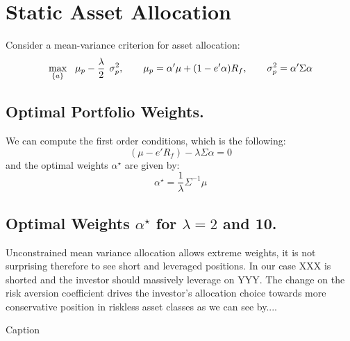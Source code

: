 \chapter{Static Asset Allocation}
Consider a mean-variance criterion for asset allocation:
\begin{equation}
    \underset{\{ a\}}{\textrm{max}} \hspace{0.3cm} \mu_p - \frac{\lambda}{2} \hspace{0.15cm} \sigma_p ^2 , \hspace{0.7cm} \mu_p = \alpha'\mu + (1 - e' \alpha)R_f, \hspace{0.7cm} \sigma_p ^2 = \alpha' \Sigma \alpha
\end{equation}

\section{Optimal Portfolio Weights.}
We can compute the first order conditions, which is the following:
$$
(\mu-e'R_f) - \lambda \Sigma \alpha = 0
$$
and the optimal weights $\alpha^\star$ are given by:
$$
\alpha^\star = \frac{1}{\lambda} \Sigma^{-1} \mu
$$


\section{Optimal Weights $\alpha^\star$ for $\lambda = 2$ and 10.}


Unconstrained mean variance allocation allows extreme weights, it is not surprising therefore to see short and leveraged positions. In our case XXX is shorted and the investor should massively leverage on YYY. The change on the risk aversion coefficient drives the investor's allocation choice towards more conservative position in riskless asset classes as we can see by....

\begin{table}[h]
    \centering
    
    \caption{Caption}
    \label{lambda210}
\end{table}

